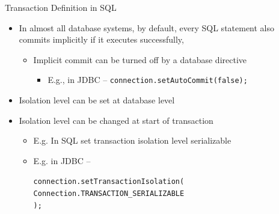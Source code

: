 \documentclass[aspectratio=169]{beamer}
\begin{document}
\begin{frame}{Transaction Definition in SQL}
    \begin{itemize}
        \item In almost all database systems, by default, every SQL statement also commits implicitly if it executes successfully,
            \begin{itemize}
                \item Implicit commit can be turned off by a database directive
                    \begin{itemize}
                        \item E.g., in JDBC -- \texttt{connection.setAutoCommit(false);}
                    \end{itemize}

            \end{itemize}
        \item Isolation level can be set at database level
        \item Isolation level can be changed at start of transaction
            \begin{itemize}
                \item E.g. In SQL set transaction isolation level serializable
                \item E.g. in JDBC -- \\
                    \begin{scriptsize}
                \texttt{connection.setTransactionIsolation(} \\
                \quad \texttt{Connection.TRANSACTION\_SERIALIZABLE} \\
                \texttt{);}
                    \end{scriptsize}

            \end{itemize}
    \end{itemize}
\end{frame}
\end{document}
